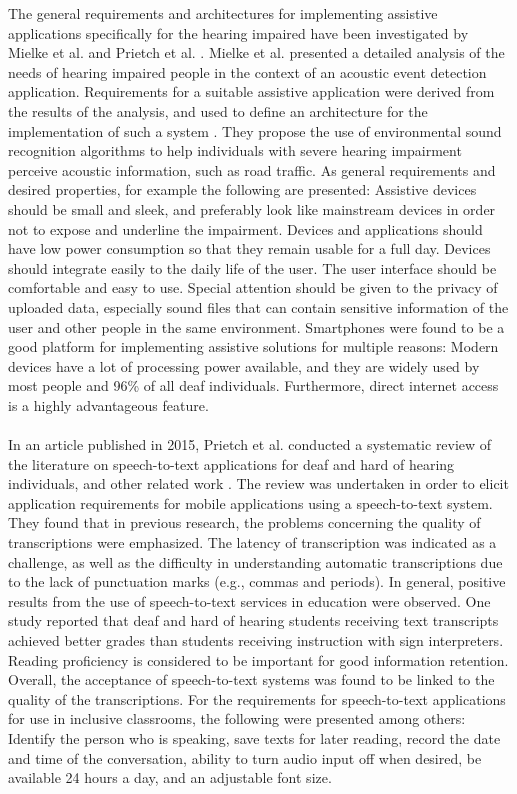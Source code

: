 \documentclass[english, 12pt, a4paper, pdftex, elec, utf8]{aaltothesis}
\begin{document}
The general requirements and architectures for implementing assistive applications specifically for the hearing impaired have been investigated by Mielke et al. \cite{mielke2013assistive} and Prietch et al. \cite{prietch2015application}. Mielke et al. presented a detailed analysis of the needs of hearing impaired people in the context of an acoustic event detection application. Requirements for a suitable assistive application were derived from the results of the analysis, and used to define an architecture for the implementation of such a system \cite{mielke2013assistive}. They propose the use of environmental sound recognition algorithms to help individuals with severe hearing impairment perceive acoustic information, such as road traffic. As general requirements and desired properties, for example the following are presented: Assistive devices should be small and sleek, and preferably look like mainstream devices in order not to expose and underline the impairment. Devices and applications should have low power consumption so that they remain usable for a full day. Devices should integrate easily to the daily life of the user. The user interface should be comfortable and easy to use. Special attention should be given to the privacy of uploaded data, especially sound files that can contain sensitive information of the user and other people in the same environment. Smartphones were found to be a good platform for implementing assistive solutions for multiple reasons: Modern devices have a lot of processing power available, and they are widely used by most people and 96\% of all deaf individuals. Furthermore, direct internet access is a highly advantageous feature. \\\\
In an article published in 2015, Prietch et al. conducted a systematic review of the literature on speech-to-text applications for deaf and hard of hearing individuals, and other related work \cite{prietch2015application}. The review was undertaken in order to elicit application requirements for mobile applications using a speech-to-text system. They found that in previous research, the problems concerning the quality of transcriptions were emphasized. The latency of transcription was indicated as a challenge, as well as the difficulty in understanding automatic transcriptions due to the lack of punctuation marks (e.g., commas and periods). In general, positive results from the use of speech-to-text services in education were observed. One study reported that deaf and hard of hearing students receiving text transcripts achieved better grades than students receiving instruction with sign interpreters. Reading proficiency is considered to be important for good information retention. Overall, the acceptance of speech-to-text systems was found to be linked to the quality of the transcriptions. For the requirements for speech-to-text applications for use in inclusive classrooms, the following were presented among others: Identify the person who is speaking, save texts for later reading, record the date and time of the conversation, ability to turn audio input off when desired, be available 24 hours a day, and an adjustable font size.
\end{document}
